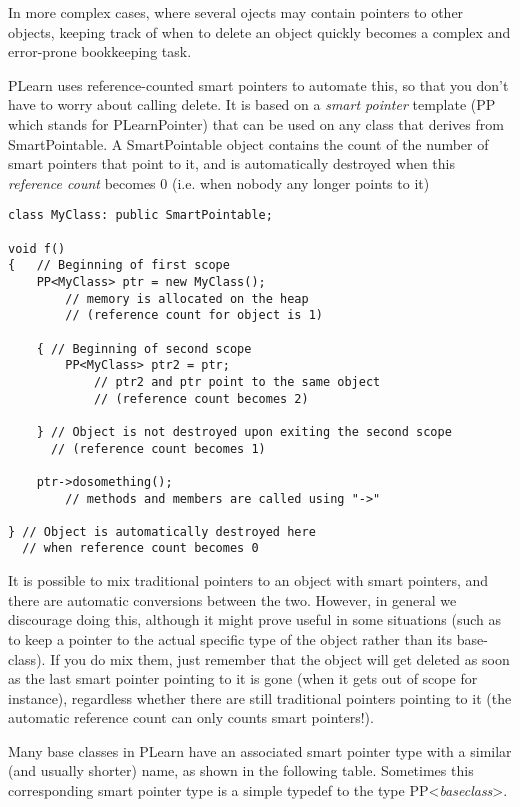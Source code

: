 \documentclass[11pt]{book}
\begin{document}
In more complex cases, where several ojects may contain pointers to
other objects, keeping track of when to delete an object quickly becomes
a complex and error-prone bookkeeping task.


 PLearn uses reference-counted smart pointers to automate this, so
that you don't have to worry about calling delete. It is based on a
\emph{smart pointer} template (PP which stands for PLearnPointer)
that can be used on any class that derives from SmartPointable. A
SmartPointable object contains the count of the number of smart
pointers that point to it, and is automatically destroyed when this
\emph{reference count} becomes 0 (i.e. when nobody any longer points
to it)

\begin{verbatim}
class MyClass: public SmartPointable;

void f()
{   // Beginning of first scope
    PP<MyClass> ptr = new MyClass();
        // memory is allocated on the heap
        // (reference count for object is 1)

    { // Beginning of second scope
        PP<MyClass> ptr2 = ptr;
            // ptr2 and ptr point to the same object
            // (reference count becomes 2)

    } // Object is not destroyed upon exiting the second scope 
      // (reference count becomes 1)

    ptr->dosomething();
        // methods and members are called using "->"

} // Object is automatically destroyed here 
  // when reference count becomes 0
\end{verbatim}

It is possible to mix traditional pointers to an object with smart
pointers, and there are automatic conversions between the two. However,
in general we discourage doing this, although it might prove useful in
some situations (such as to keep a pointer to the actual specific type
of the object rather than its base-class). If you do mix them, just
remember that the object will get deleted as soon as the last smart
pointer pointing to it is gone (when it gets out of scope for instance),
regardless whether there are still traditional pointers pointing to it
(the automatic reference count can only counts smart pointers!).


 Many base classes in PLearn have an associated smart pointer type
with a similar (and usually shorter) name, as shown in the following
table. Sometimes this corresponding smart pointer type is a simple
typedef to the type PP<\emph{baseclass}>.
\end{document}
